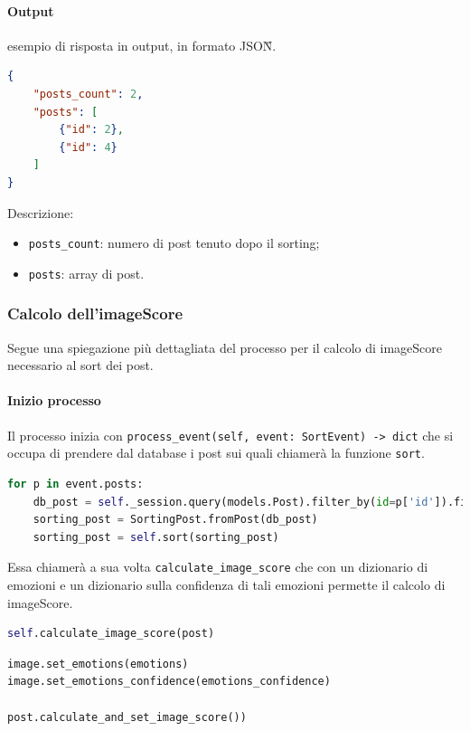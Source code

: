 \paragraph*{Output} esempio di risposta in output, in formato JSON\G{}.
\begin{lstlisting}[language=JSON]
{
    "posts_count": 2,
    "posts": [
        {"id": 2},
        {"id": 4}
    ]
}
\end{lstlisting}
Descrizione:
\begin{itemize}
    \item \verb|posts_count|: numero di post tenuto dopo il sorting;
    \item \verb|posts|: array di post. 
\end{itemize}

\subsubsection{Calcolo dell'imageScore}
Segue una spiegazione più dettagliata del processo per il calcolo di imageScore necessario al sort dei post.
\paragraph{Inizio processo} \aCapo{}
Il processo inizia con \verb+process_event(self, event: SortEvent) -> dict+ che si occupa di prendere dal database i post sui quali chiamerà la funzione \verb+sort+.
\begin{lstlisting}[language=Python]
for p in event.posts:
    db_post = self._session.query(models.Post).filter_by(id=p['id']).first()
    sorting_post = SortingPost.fromPost(db_post)
    sorting_post = self.sort(sorting_post)
\end{lstlisting} 
Essa chiamerà a sua volta \verb+calculate_image_score+ che con un dizionario di emozioni e un dizionario sulla confidenza di tali emozioni permette il calcolo di imageScore.
\begin{lstlisting}[language=Python]
self.calculate_image_score(post)
\end{lstlisting}
\begin{lstlisting}[language=Python]
image.set_emotions(emotions)
image.set_emotions_confidence(emotions_confidence)

post.calculate_and_set_image_score())
\end{lstlisting} 

